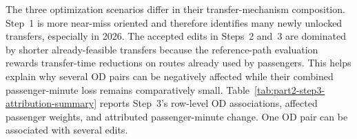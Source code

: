 \documentclass[preprint,12pt]{elsarticle}
\begin{document}
\newpage

The three optimization scenarios differ in their transfer-mechanism composition. Step~1 is more near-miss oriented and therefore identifies many newly unlocked transfers, especially in 2026. The accepted edits in Steps~2 and~3 are dominated by shorter already-feasible transfers because the reference-path evaluation rewards transfer-time reductions on routes already used by passengers. This helps explain why several OD pairs can be negatively affected while their combined passenger-minute loss remains comparatively small. Table~\ref{tab:part2-step3-attribution-summary} reports Step~3's row-level OD associations, affected passenger weights, and attributed passenger-minute change. One OD pair can be associated with several edits.

\begin{table}[htbp]
\centering
\small
\setlength{\tabcolsep}{3.2pt}
\caption[Step~3 row-level attribution summary]{Step~3 row-level attribution summary. Positive attributed savings indicate lower pax-min.}
\label{tab:part2-step3-attribution-summary}
\end{table}
\end{document}
